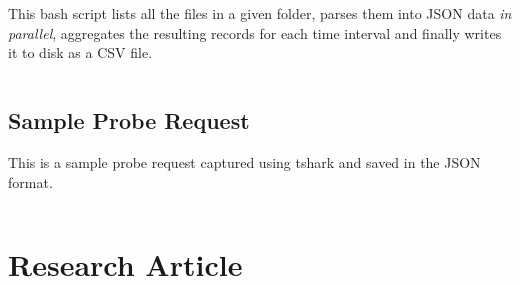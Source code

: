 This bash script lists all the files in a given folder, parses them into JSON data \textit{in parallel}, aggregates the resulting records for each time interval and finally writes it to disk as a CSV file.
\vspace{1em}
\inputminted{bash}{analysis/data-toolkit/new-toolkit-parallel.sh}

\pagebreak
\section{Sample Probe Request} \label{appendix:sampleprobe}
This is a sample probe request captured using tshark and saved in the JSON format.

\vspace{1em}
\inputminted{javascript}{analysis/data-collection/samplepacket.json}


\chapter{Research Article}

